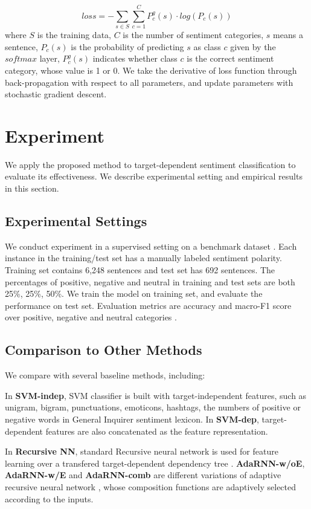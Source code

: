 \documentclass[11pt]{article}
\begin{document}
\begin{equation}
loss = -\sum_{s \in S}^{}\sum_{c = 1}^{C}P_{c}^{g}(s) \cdot log(P_{c}(s))
\end{equation}
where $S$ is the training data, $C$ is the number of sentiment categories, $s$ means a sentence, $P_c(s)$ is the probability of predicting $s$ as class $c$ given by the $softmax$ layer, $P^g_c(s)$ indicates whether class $c$ is the correct sentiment category, whose value is 1 or 0.
We take the derivative of loss function through back-propagation with respect to all parameters, and update parameters with stochastic gradient descent. 


\section{Experiment}
We apply the proposed method to target-dependent sentiment classification to evaluate its effectiveness.
We describe experimental setting and empirical results in this section.

\subsection{Experimental Settings}
We conduct experiment in a supervised setting on a benchmark dataset \cite{Dong2014a}. Each instance in the training/test set has a manually labeled sentiment polarity. 
Training set contains 6,248 sentences and test set has 692 sentences. 
The percentages of positive, negative and neutral in training and test sets are both 25\%, 25\%, 50\%.
We train the model on training set, and evaluate the performance on test set. 
Evaluation metrics are accuracy and macro-F1 score over positive, negative and neutral categories \cite{Manning1999,Jurafsky2000}.


\subsection{Comparison to Other Methods}

We compare with several baseline methods, including:

In \textbf{SVM-indep}, SVM classifier is built with target-independent features, such as unigram, bigram, punctuations, emoticons, hashtags, the numbers of positive or negative words in General Inquirer sentiment lexicon. 
In \textbf{SVM-dep}, target-dependent features \cite{Jiang2011} are also concatenated as the feature representation. 

In \textbf{Recursive NN}, standard Recursive neural network is used for feature learning over a transfered target-dependent dependency tree \cite{Dong2014a}. \textbf{AdaRNN-w/oE}, \textbf{AdaRNN-w/E} and \textbf{AdaRNN-comb} are different variations of adaptive recursive neural network \cite{Dong2014a}, whose composition functions are adaptively selected according to the inputs. 
\end{document}
